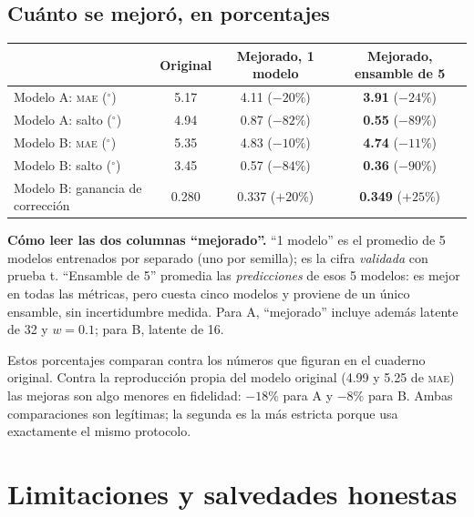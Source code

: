 \documentclass[11pt,a4paper]{article}
\newcommand{\gr}{$^\circ$}
\newcommand{\mae}{\textsc{mae}}
\begin{document}
\subsection*{Cuánto se mejoró, en porcentajes}

\begin{center}
\small
\begin{tabular}{lccc}
\toprule
 & \textbf{Original} & \textbf{Mejorado, 1 modelo} & \textbf{Mejorado, ensamble de 5} \\
\midrule
Modelo A: \mae{} (\gr) & 5.17 & 4.11 ($-20\%$) & \textbf{3.91} ($-24\%$) \\
Modelo A: salto (\gr) & 4.94 & 0.87 ($-82\%$) & \textbf{0.55} ($-89\%$) \\[3pt]
Modelo B: \mae{} (\gr) & 5.35 & 4.83 ($-10\%$) & \textbf{4.74} ($-11\%$) \\
Modelo B: salto (\gr) & 3.45 & 0.57 ($-84\%$) & \textbf{0.36} ($-90\%$) \\
Modelo B: ganancia de corrección & 0.280 & 0.337 ($+20\%$) & \textbf{0.349} ($+25\%$) \\
\bottomrule
\end{tabular}
\end{center}

\textbf{Cómo leer las dos columnas ``mejorado''.} ``1 modelo'' es el promedio de 5 modelos entrenados por separado (uno por semilla); es la cifra \emph{validada} con prueba t. ``Ensamble de 5'' promedia las \emph{predicciones} de esos 5 modelos: es mejor en todas las métricas, pero cuesta cinco modelos y proviene de un único ensamble, sin incertidumbre medida. Para A, ``mejorado'' incluye además latente de 32 y $w=0.1$; para B, latente de 16.

\begin{cuidado}
Estos porcentajes comparan contra los números que figuran en el cuaderno original. Contra la reproducción propia del modelo original (4.99 y 5.25 de \mae{}) las mejoras son algo menores en fidelidad: $-18\%$ para A y $-8\%$ para B. Ambas comparaciones son legítimas; la segunda es la más estricta porque usa exactamente el mismo protocolo.
\end{cuidado}

\section{Limitaciones y salvedades honestas}
\label{sec:limites}
\end{document}
